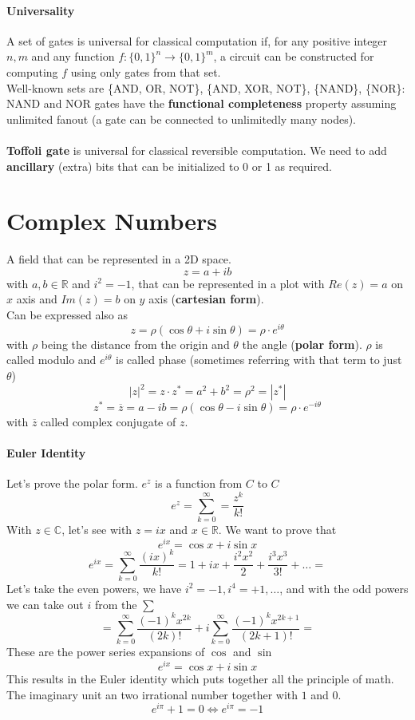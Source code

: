 \documentclass[10pt]{report}
\begin{document}
\paragraph{Universality} A set of gates is universal for classical computation if, for any positive integer $n,m$ and any function $f : \{0,1\}^n\rightarrow \{0,1\}^m$, a circuit can be constructed for computing $f$ using only gates from that set.\\
Well-known sets are \{AND, OR, NOT\}, \{AND, XOR, NOT\}, \{NAND\}, \{NOR\}:  NAND and NOR gates have the \textbf{functional completeness} property assuming unlimited fanout (a gate can be connected to unlimitedly many nodes).\\\\
\textbf{Toffoli gate} is universal for classical reversible computation. We need to add \textbf{ancillary} (extra) bits that can be initialized to 0 or 1 as required.
\section{Complex Numbers}
A field that can be represented in a 2D space.
$$z = a + ib$$ with $a,b \in \mathbb{R}$ and $i^2 = -1$, that can be represented in a plot with $Re(z) = a$ on $x$ axis and $Im(z) = b$ on $y$ axis (\textbf{cartesian form}).\\
Can be expressed also as $$z = \rho(\cos\theta + i \sin\theta) = \rho \cdot e^{i\theta}$$ with $\rho$ being the distance from the origin and $\theta$ the angle (\textbf{polar form}). $\rho$ is called modulo and $e^{i\theta}$ is called phase (sometimes referring with that term to just $\theta$)
$$|z|^2 = z\cdot z^* = a^2 + b^2 = \rho^2 = |z^*|$$
$$z^* = \overline{z} = a-ib = \rho(\cos\theta - i\sin\theta) = \rho\cdot e^{-i\theta}$$
with $\overline{z}$ called complex conjugate of $z$.
\paragraph{Euler Identity} Let's prove the polar form. $e^z$ is a function from $C$ to $C$
$$e^z = \sum_{k=0}^\infty = \frac{z^k}{k!}$$
With $z\in \mathbb{C}$, let's see with $z = ix$ and $x\in \mathbb{R}$. We want to prove that
$$e^{ix} = \cos x + i\sin x$$
\pagebreak
$$e^{ix} = \sum_{k=0}^\infty \frac{(ix)^k}{k!} = 1 + ix + \frac{i^2x^2}{2} + \frac{i^3x^3}{3!} + \ldots=$$
Let's take the even powers, we have $i^2 = -1, i^4 = +1,\ldots$, and with the odd powers we can take out $i$ from the $\sum$
$$= \sum_{k=0}^\infty \frac{(-1)^{k}x^{2k}}{(2k)!} + i\sum_{k=0}^\infty \frac{(-1)^k x^{2k+1}}{(2k+1)!} =$$
These are the power series expansions of $\cos$ and $\sin$
$$e^{ix}=\cos x + i \sin x$$
This results in the Euler identity which puts together all the principle of math. The imaginary unit an two irrational number together with $1$ and $0$.
$$e^{i\pi} + 1 = 0 \Leftrightarrow e^{i\pi} = -1$$
\end{document}
